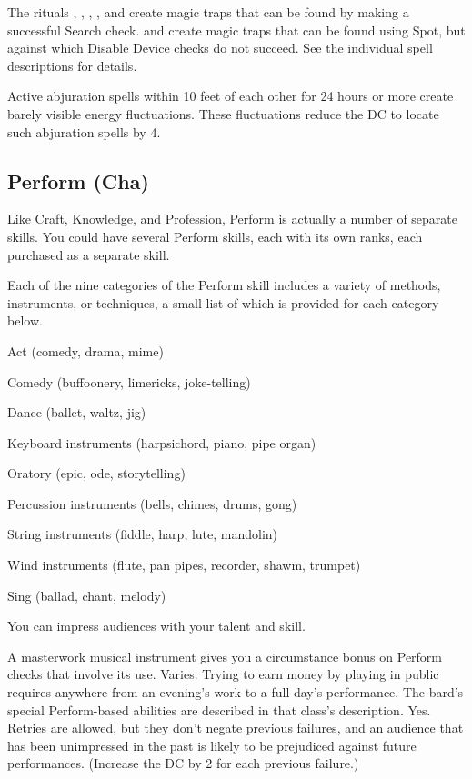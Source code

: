 \par The rituals ,  ,  ,  , and  create magic traps  that can be found by making a successful Search check.  and  create magic traps that can be found using Spot, but against which Disable Device checks do not succeed. See the individual spell descriptions for details.

\par Active abjuration spells within 10 feet of each other for 24 hours or more create barely visible energy fluctuations. These fluctuations reduce the DC to locate such abjuration spells by 4.

\subsection{Perform (Cha)}
\par Like Craft, Knowledge, and Profession, Perform is actually a number of separate skills. You could have several Perform skills, each with its own ranks, each purchased as a separate skill.

Each of the nine categories of the Perform skill includes a variety of methods, instruments, or techniques, a small list of which is provided for each category below.
\begin{itemize*}
\item Act (comedy, drama, mime)
\item Comedy (buffoonery, limericks, joke-telling)
\item Dance (ballet, waltz, jig)
\item Keyboard instruments (harpsichord, piano, pipe organ)
\item Oratory (epic, ode, storytelling)
\item Percussion instruments (bells, chimes, drums, gong)
\item String instruments (fiddle, harp, lute, mandolin)
\item Wind instruments (flute, pan pipes, recorder, shawm, trumpet)
\item Sing (ballad, chant, melody)
\end{itemize*}
 You can impress audiences with your talent and skill.
\par A masterwork musical instrument gives you a  circumstance bonus on Perform checks that involve its use.
 Varies. Trying to earn money by playing in public requires anywhere from an evening's work to a full day's performance. The bard's special Perform-based abilities are described in that class's description.
 Yes. Retries are allowed, but they don't negate previous failures, and an audience that has been unimpressed in the past is likely to be prejudiced against future performances. (Increase the DC by 2 for each previous failure.)

